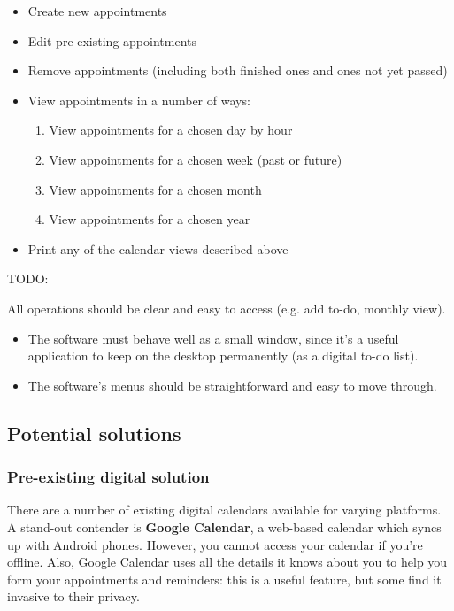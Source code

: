 \begin{itemize}
  \item Create new appointments
  \item Edit pre-existing appointments
  \item Remove appointments (including both finished ones and ones not yet passed)
  \item View appointments in a number of ways:
  \begin{enumerate}
      \item View appointments for a chosen day by hour
      \item View appointments for a chosen week (past or future)
      \item View appointments for a chosen month
      \item View appointments for a chosen year
  \end{enumerate}
  \item Print any of the calendar views described above
\end{itemize}

TODO:

All operations should be clear and easy to access (e.g. add to-do,
monthly view).

\begin{itemize}
  \item The software must behave well as a small window, since it's a useful
        application to keep on the desktop permanently (as a digital to-do
        list).
  \item The software's menus should be straightforward and easy to move through.
\end{itemize}


\subsection{Potential solutions}
\subsubsection{Pre-existing digital solution}

There are a number of existing digital calendars available for varying
platforms. A stand-out contender is \textbf{Google Calendar}, a web-based
calendar which syncs up with Android phones. However, you cannot access your
calendar if you're offline. Also, Google Calendar uses all the details it knows
about you to help you form your appointments and reminders: this is a useful
feature, but some find it invasive to their privacy.


